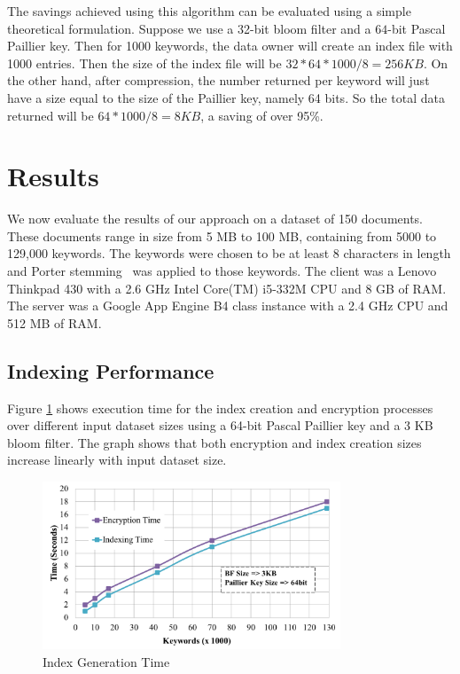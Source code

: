 The savings achieved using this algorithm can be evaluated using a simple theoretical
formulation. Suppose we use a 32-bit bloom filter and a $64$-bit Pascal Paillier key.
Then for 1000 keywords, the data owner will create an index file with 1000 entries.
Then the size of the index file will be $32*64*1000/8 = 256KB$. On the other hand,
after compression, the number returned per keyword will just have a size equal to the
size of the Paillier key, namely 64 bits. So the total data returned will be 
$64*1000/8 = 8KB$, a saving of over 95\%.


\section{Results}
\label{sec:eval}

We now evaluate the results of our approach on a dataset of 150 documents. 
These documents range in size from 5 MB to 100 MB, containing from 5000 to
129,000 keywords. The keywords were chosen to be at least 8 characters in
length and Porter stemming~\cite{porter} was applied to those keywords.
The client was a Lenovo Thinkpad 430 with a 2.6 GHz Intel Core(TM) i5-332M
CPU and 8 GB of RAM. The server was a Google App Engine B4 class instance
with a 2.4 GHz CPU and 512 MB of RAM.

\subsection{Indexing Performance}
Figure \ref{fig:Index-Generation-Time} shows execution time for the index creation
and encryption 
processes over different input dataset sizes 
using a 64-bit Pascal Paillier key and a 3 KB bloom filter. The graph shows that
both encryption and index creation sizes increase linearly with input dataset size.

\begin{figure}[h!]
  \centering
  \includegraphics[width=3.5in]{figures/indexing_encryption_time.png}
  \caption{Index Generation Time}
  \label{fig:Index-Generation-Time}
\end{figure}

